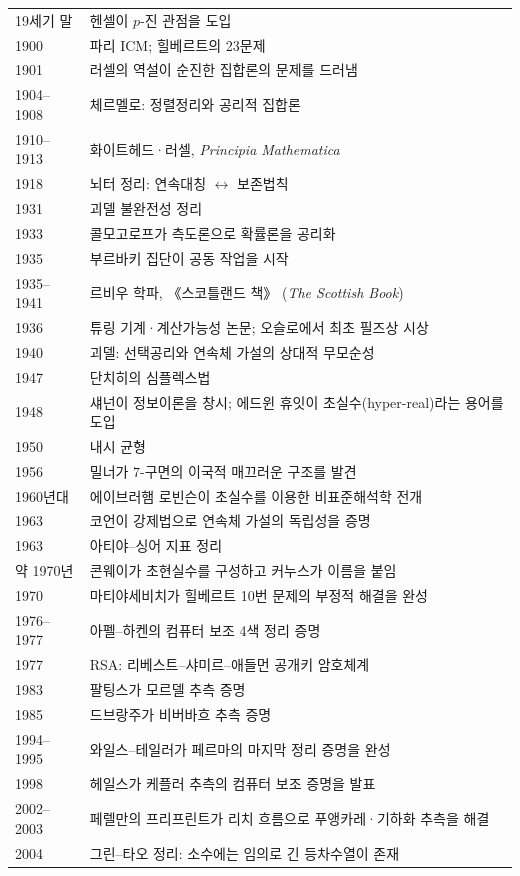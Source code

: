 \begin{center}
\begin{longtable}{@{}L{0.14\textwidth}L{0.78\textwidth}@{}}
19세기 말 & 헨셀이 $p$-진 관점을 도입\\
1900 & 파리 ICM; 힐베르트의 23문제\\
1901 & 러셀의 역설이 순진한 집합론의 문제를 드러냄\\
1904--1908 & 체르멜로: 정렬정리와 공리적 집합론\\
1910--1913 & 화이트헤드·러셀, \textit{Principia Mathematica}\\
1918 & 뇌터 정리: 연속대칭 $\leftrightarrow$ 보존법칙\\
1931 & 괴델 불완전성 정리\\
1933 & 콜모고로프가 측도론으로 확률론을 공리화\\
1935 & 부르바키 집단이 공동 작업을 시작\\
1935--1941 & 르비우 학파, 《스코틀랜드 책》 (\textit{The Scottish Book})\\
1936 & 튜링 기계·계산가능성 논문; 오슬로에서 최초 필즈상 시상\\
1940 & 괴델: 선택공리와 연속체 가설의 상대적 무모순성\\
1947 & 단치히의 심플렉스법\\
1948 & 섀넌이 정보이론을 창시; 에드윈 휴잇이 초실수(hyper-real)라는 용어를 도입\\
1950 & 내시 균형\\
1956 & 밀너가 $7$-구면의 이국적 매끄러운 구조를 발견\\
1960년대 & 에이브러햄 로빈슨이 초실수를 이용한 비표준해석학 전개\\
1963 & 코언이 강제법으로 연속체 가설의 독립성을 증명\\
1963 & 아티야--싱어 지표 정리\\
약 1970년 & 콘웨이가 초현실수를 구성하고 커누스가 이름을 붙임\\
1970 & 마티야세비치가 힐베르트 10번 문제의 부정적 해결을 완성\\
1976--1977 & 아펠--하켄의 컴퓨터 보조 4색 정리 증명\\
1977 & RSA: 리베스트--샤미르--애들먼 공개키 암호체계\\
1983 & 팔팅스가 모르델 추측 증명\\
1985 & 드브랑주가 비버바흐 추측 증명\\
1994--1995 & 와일스--테일러가 페르마의 마지막 정리 증명을 완성\\
1998 & 헤일스가 케플러 추측의 컴퓨터 보조 증명을 발표\\
2002--2003 & 페렐만의 프리프린트가 리치 흐름으로 푸앵카레·기하화 추측을 해결\\
2004 & 그린--타오 정리: 소수에는 임의로 긴 등차수열이 존재\\

\end{longtable}
\end{center}
